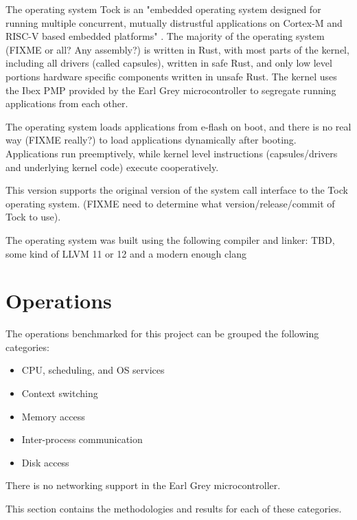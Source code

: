 \documentclass{article}
\begin{document}
The operating system Tock is an "embedded operating system designed for running multiple concurrent, mutually distrustful applications on Cortex-M and RISC-V based embedded platforms" \cite{tockgithub}. The majority of the operating system (FIXME or all? Any assembly?) is written in Rust, with most parts of the kernel, including all drivers (called capsules), written in safe Rust, and only low level portions hardware specific components written in unsafe Rust. The kernel uses the Ibex PMP provided by the Earl Grey microcontroller to segregate running applications from each other.

The operating system loads applications from e-flash on boot, and there is no real way (FIXME really?) to load applications dynamically after booting. Applications run preemptively, while kernel level instructions (capsules/drivers and underlying kernel code) execute cooperatively.

This version supports the original version of the system call interface to the Tock operating system. (FIXME need to determine what version/release/commit of Tock to use).

The operating system was built using the following compiler and linker: TBD, some kind of LLVM 11 or 12 and a modern enough clang

\section{Operations}

The operations benchmarked for this project can be grouped the following categories:

\begin{itemize}
    \item CPU, scheduling, and OS services
    \item Context switching
    \item Memory access
    \item Inter-process communication
    \item Disk access
\end{itemize}

There is no networking support in the Earl Grey microcontroller.

This section contains the methodologies and results for each of these categories.

\end{document}

